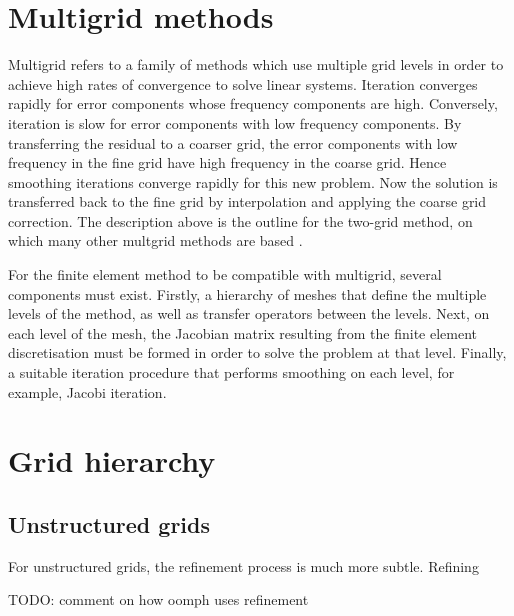 \section{Multigrid methods}

Multigrid refers to a family of methods which use multiple grid levels in order to achieve high rates of convergence to solve linear systems.
Iteration converges rapidly for error components whose frequency components are high.
Conversely, iteration is slow for error components with low frequency components.
By transferring the residual to a coarser grid, the error components with low frequency in the fine grid have high frequency in the coarse grid.
Hence smoothing iterations converge rapidly for this new problem.
Now the solution is transferred back to the fine grid by interpolation and applying the coarse grid correction.
The description above is the outline for the two-grid method, on which many other multgrid methods are based \cite{hackbusch}.


\iffalse

The Poisson problem:
	- Well behaved
	- Eigenvalues of the residual
	- Optimal method for finding solution

Helmholtz problem:
	- Misbehaved
	- Poor convergence
	- Indefinite discretisation matrix

\fi

For the finite element method to be compatible with multigrid, several components must exist.
Firstly, a hierarchy of meshes that define the multiple levels of the method, as well as transfer operators between the levels.
Next, on each level of the mesh, the Jacobian matrix resulting from the finite element discretisation must be formed in order to solve the problem at that level.
Finally, a suitable iteration procedure that performs smoothing on each level, for example, Jacobi iteration.

\section{Grid hierarchy}

\subsection{Unstructured grids}
For unstructured grids, the refinement process is much more subtle.
Refining 

TODO: comment on how oomph uses refinement
